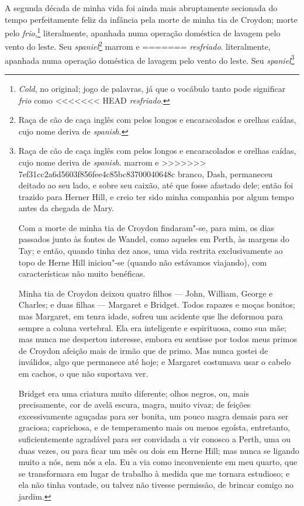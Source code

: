 {{{{{{{{{{{{{{{{{{{{{{A segunda década de minha vida foi ainda mais abruptamente secionada do
tempo perfeitamente feliz da infância pela morte de minha tia de
Croydon; morte pelo \textit{frio},\footnote{\textit{Cold}, no original; jogo de
  palavras, já que o vocábulo tanto pode significar \textit{frio} como
<<<<<<< HEAD
  \textit{resfriado}.} literalmente, apanhada numa operação
doméstica de lavagem pelo vento do leste. Seu \textit{spaniel}\footnote{Raça
  de cão de caça inglês com pelos longos e encaracolados e orelhas
  caídas, cujo nome deriva de \textit{spanish}.} marrom e
=======
  \textit{resfriado}.  literalmente, apanhada numa operação
doméstica de lavagem pelo vento do leste. Seu \textit{spaniel}\footnote{Raça
  de cão de caça inglês com pelos longos e encaracolados e orelhas
  caídas, cujo nome deriva de \textit{spanish}.  marrom e
>>>>>>> 7ef31cc2a6d5603f856fee4c85bc83700040648c
branco, Dash, permaneceu deitado ao seu lado, e sobre seu caixão, até
que fosse afastado dele; então foi trazido para Herner Hill, e creio ter
sido minha companhia por algum tempo antes da chegada de Mary.

Com a morte de minha tia de Croydon findaram"-se, para mim, os dias
passados junto às fontes de Wandel, como aqueles em Perth, às margens do
Tay; e então, quando tinha dez anos, uma vida restrita exclusivamente ao
topo de Herne Hill iniciou"-se (quando não estávamos viajando), com
características não muito benéficas.

Minha tia de Croydon deixou quatro filhos --- John, William, George e
Charles; e duas filhas --- Margaret e Bridget. Todos rapazes e moças
bonitos; mas Margaret, em tenra idade, sofreu um acidente que lhe
deformou para sempre a coluna vertebral. Ela era inteligente e
espirituosa, como sua mãe; mas nunca me despertou interesse, embora eu
sentisse por todos meus primos de Croydon afeição mais de irmão que de
primo. Mas nunca gostei de inválidos, algo que permanece até hoje; e
Margaret costumava usar o cabelo em cachos, o que não suportava ver.

Bridget era uma criatura muito diferente; olhos negros, ou, mais
precisamente, cor de avelã escura, magra, muito vivaz; de feições
excessivamente aguçadas para ser bonita, um pouco magra demais para ser
graciosa; caprichosa, e de temperamento mais ou menos egoísta,
entretanto, suficientemente agradável para ser convidada a vir conosco a
Perth, uma ou duas vezes, ou para ficar um mês ou dois em Herne Hill;
mas nunca se ligando muito a nós, nem nós a ela. Eu a via como
inconveniente em meu quarto, que se transformara em lugar de trabalho à
medida que me tornara estudioso; e ela não tinha vontade, ou talvez não
tivesse permissão, de brincar comigo no jardim.

}}}}}}}}}}}}}}}}}}}}}}}

